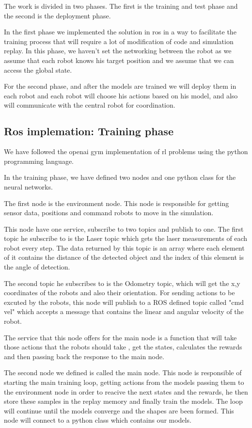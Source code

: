 \documentclass[12pt]{extarticle}
\begin{document}
The work is divided in two phases. The first is the training and test phase  and   the second  is the deployment phase.

In the first phase we implemented the solution in ros in a way to facilitate the training process that will require a lot of modification of code and simulation replay. In this phase, we haven't set the networking between the robot as we assume that each robot knows his target position and we assume that we can access the global state.


For the second phase, and after the models are trained we will deploy them in each robot and each robot will choose his actions based on his model, and also will communicate with the central robot for coordination.


\subsection{Ros implemation: Training phase}

We have followed the openai gym implementation of  rl problems using the python programming language.

In the training phase, we have defined two nodes and one python class for the neural networks.
 

The first node is the environment node. This node is responsible for getting sensor data, positions and command robots to move in the simulation.

This node have one service, subscribe to  two topics and publish to one. The first topic he subscribe to is the Laser topic which gets the laser measurements of each robot every step. The data returned   by this topic is an array where each element of it contains the distance of the detected object and the index of this element is the angle of detection.


The second topic he subscribes to is the Odometry topic, which will get the x,y coordinates of the robots and also their orientation. For sending actions to be excuted by the robots, this node will publish to a ROS defined topic called "cmd vel" which accepts a message that contains the linear and angular velocity of the robot.


The service that this node offers for the main node is  a function that will take those actions that the robots should take , get the states, calculates the rewards and then passing   back the response to the main node. 



The second node we defined  is called  the main node. This node   is responsible of starting the main training loop, getting actions from the models passing them to the environment node in order to reacive the next states and the rewards, he then store these samples in the replay memory and finally train the models.
The loop will continue until the models converge and the shapes are been formed. This node will connect to a python class which contains our models.
\end{document}
